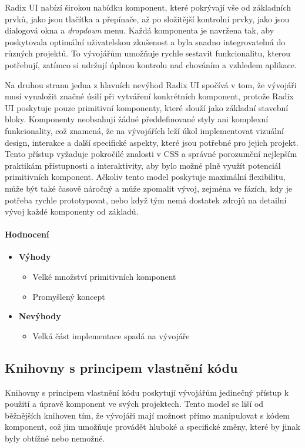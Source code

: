 Radix UI nabízí širokou nabídku komponent, které pokrývají vše od základních prvků, jako jsou tlačítka a přepínače, až po složitější kontrolní prvky, jako jsou dialogová okna a \emph{dropdown} menu. Každá komponenta je navržena tak, aby poskytovala optimální uživatelskou zkušenost a byla snadno integrovatelná do různých projektů. To vývojářům umožňuje rychle sestavit funkcionalitu, kterou potřebují, zatímco si udržují úplnou kontrolu nad chováním a vzhledem aplikace.

Na druhou stranu jedna z hlavních nevýhod Radix UI spočívá v tom, že vývojáři musí vynaložit značné úsilí při vytváření konkrétních komponent, protože Radix UI poskytuje pouze primitivní komponenty, které slouží jako základní stavební bloky. Komponenty neobsahují žádné předdefinované styly ani komplexní funkcionality, což znamená, že na vývojářích leží úkol implementovat vizuální design, interakce a další specifické aspekty, které jsou potřebné pro jejich projekt. Tento přístup vyžaduje pokročilé znalosti v CSS a správné porozumění nejlepším praktikám přístupnosti a interaktivity, aby bylo možné plně využít potenciál primitivních komponent. Ačkoliv tento model poskytuje maximální flexibilitu, může být také časově náročný a může zpomalit vývoj, zejména ve fázích, kdy je potřeba rychle prototypovat, nebo když tým nemá dostatek zdrojů na detailní vývoj každé komponenty od základů.

\paragraph{Hodnocení}

\begin{itemize}
    \item \textbf{Výhody}
    \begin{itemize}
        \item Velké množství primitivních komponent
        \item Promyšlený koncept
    \end{itemize}
    \item \textbf{Nevýhody}
    \begin{itemize}
        \item Velká část implementace spadá na vývojáře
    \end{itemize}
\end{itemize}

\subsection{Knihovny s principem vlastnění kódu}
Knihovny s principem vlastnění kódu poskytují vývojářům jedinečný přístup k použití a úpravě komponent ve svých projektech. Tento model se liší od běžnějších knihoven tím, že vývojáři mají možnost přímo manipulovat s kódem komponent, což jim umožňuje provádět hluboké a specifické změny, které by jinak byly obtížné nebo nemožné.

